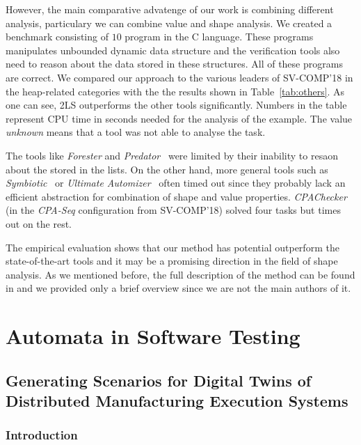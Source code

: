 {However, the main comparative advatenge of our work is combining different analysis,
particulary we can combine value and shape analysis.
We created a benchmark consisting of $10$ program in the C language.
These programs manipulates unbounded dynamic data structure and the verification tools also need to
reason about the data stored in these structures.
All of these programs are correct.
We compared our approach to the various leaders of SV-COMP'18 in
the heap-related categories with the the results shown in Table~\ref{tab:others}.
As one can see, 2LS outperforms the other tools significantly.
Numbers in the table represent CPU time in seconds needed for the
analysis of the example.
The value \emph{unknown} means that a tool was not able to analyse
the task.
%

The tools like \emph{Forester} and \emph{Predator}~\cite{dudka13sas} were
limited by their inability to resaon about the stored in the lists.
On the other hand, more general tools such as \emph{Symbiotic}~\cite{CVS18} or
\emph{Ultimate Automizer}~\cite{HCDGHLNM18} often timed out since they
probably lack an efficient abstraction for combination of shape and
value properties. \emph{CPAChecker}~\cite{BK11} (in the
\emph{CPA-Seq} configuration from SV-COMP'18) solved four tasks but
times out on the rest.

The empirical evaluation shows that our method has potential outperform the
state-of-the-art tools and it may be a promising direction in the field of shape
analysis.
As we mentioned before, the full description of the method can be found in \cite{fmcad18}
and we provided only a brief overview since we are not the main authors of it.

\part{Automata in Software Testing}

\chapter{Generating Scenarios for Digital Twins of Distributed Manufacturing Execution Systems}
\label{ch:eurocast}
\section{Introduction}

}
